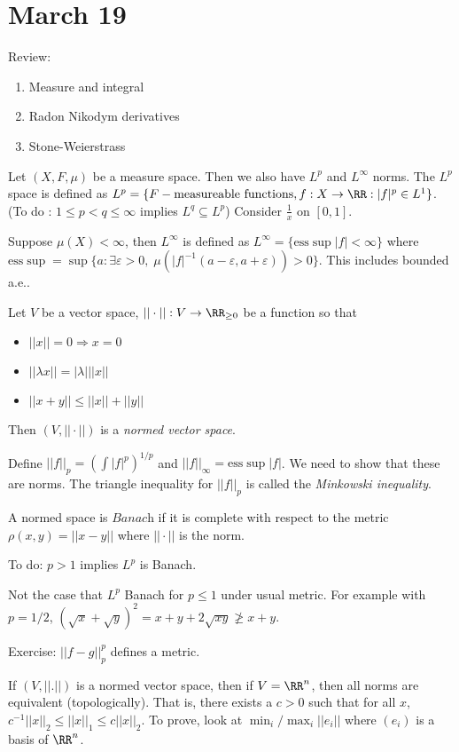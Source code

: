 \documentclass{../uva7310}
\begin{document}
\section{March 19}

Review:
\begin{enumerate}
    \item Measure and integral
    \item Radon Nikodym derivatives
    \item Stone-Weierstrass
\end{enumerate}

Let $(X,F,\mu)$ be a measure space. Then we also have $L^p$ and $L^\infty$ norms. The $L^p$ space is defined as
$L^p=\{F-\text{measureable functions}, f:X\rightarrow\RR: |f|^p\in L^1\}$. (To do : $1\leq p<q\leq\infty$ implies $L^q\subseteq L^p$)
Consider $\frac{1}{x}$ on $[0,1]$. 

Suppose $\mu(X)<\infty$, then $L^\infty$ is defined as $L^\infty=\{\text{ess}\sup |f|<\infty\}$ where
$\text{ess}\sup=\sup\{a:\exists\varepsilon>0,\;\mu(|f|^{-1}(a-\varepsilon,a+\varepsilon))>0\}$. This includes bounded a.e..

Let $V$ be a vector space, $||\cdot||:V\rightarrow\RR_{\geq0}$ be a function so that
\begin{itemize}
    \item $||x||=0\Rightarrow x=0$
    \item $||\lambda x||=|\lambda| ||x||$
    \item $||x+y||\leq ||x||+||y||$
\end{itemize}
Then $(V,||\cdot||)$ is a \textit{normed vector space}.

Define $||f||_p=\left(\int|f|^p\right)^{1/p}$ and $||f||_\infty = \text{ess}\sup |f|$. We need to show that these are
norms. The triangle inequality for $||f||_p$ is called the \textit{Minkowski inequality}.

A normed space is $\textit{Banach}$ if it is complete with respect to the metric $\rho(x,y)=||x-y||$ where $||\cdot||$
is the norm.

To do: $p>1$ implies $L^p$ is Banach.

Not the case that $L^p$ Banach for $p\leq 1$ under usual metric. For example with $p=1/2$, $(\sqrt{x}+\sqrt{y})^2=x+y+2\sqrt{xy}\not\geq x+y$.

Exercise: $||f-g||_p^p$ defines a metric.

If $(V,||.||)$ is a normed vector space, then if $V=\RR^n$, then all norms are equivalent (topologically). That is, there exists a $c>0$ such that for
all $x$, $c^{-1}||x||_2\leq ||x||_1\leq c||x||_2$. To prove, look at $\min_i/\max_i ||e_i||$ where $(e_i)$ is a basis of $\RR^n$.
\end{document}
